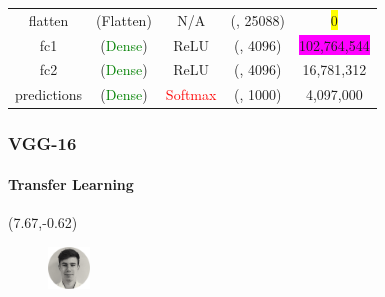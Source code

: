 \begin{frame}
\begin{center}
{\begin{tabular}{ccccc}
flatten & (Flatten) & N/A & (, 25088) & \colorbox{yellow}{0} \\         
fc1 & (\textcolor{green}{Dense}) & ReLU & (, 4096) & \colorbox{magenta}{102,764,544} \\ 
fc2 & (\textcolor{green}{Dense}) & ReLU & (, 4096) & 16,781,312 \\  
predictions & (\textcolor{green}{Dense}) & \textcolor{red}{Softmax} & (, 1000) & 4,097,000   
\end{tabular}
}
\end{center}
\end{frame}

\begin{frame}
\frametitle{VGG-16}
\framesubtitle{Transfer Learning} 

\begin{textblock}{15}(7.67,-0.62)
	\begin{figure}[H]
		\includegraphics[width=0.1\textwidth]{Images/Team/DamienTOOMEY.png} 
	\end{figure}
\end{textblock}


\end{frame}
